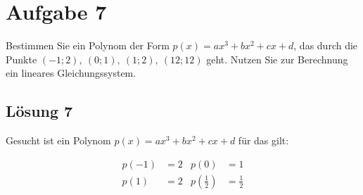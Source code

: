 
\section{Aufgabe 7}

Bestimmen Sie ein Polynom der Form $\displaystyle p( x) =ax^{3} +bx^{2} +cx+d$, das durch die Punkte $\displaystyle ( -1;2) ,\ ( 0;1) ,\ ( 1;2) ,\ ( 12;12)$ geht. Nutzen Sie zur Berechnung ein lineares Gleichungssystem.



\subsection{Lösung 7}


Gesucht ist ein Polynom $\displaystyle p( x) =ax^{3} +bx^{2} +cx+d$ für das gilt:

\begin{align*}
	p( -1) & =2 & p( 0) & =1\\
	p( 1) & =2 & p\left(\frac{1}{2}\right) & =\frac{1}{2}
\end{align*}

